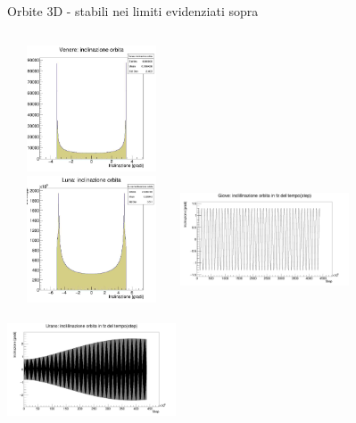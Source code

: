         \begin{frame}{Orbite 3D - stabili nei limiti evidenziati sopra}
            \begin{columns}
                    \centering        
                    \includegraphics[width=5cm,height=3.75cm]{7_incli/ven_incl_500_3600.jpg}\\
                    \includegraphics[width=5cm,height=3.75cm]{7_incli/lun_incl_600_60.jpg}
                    \label{cfr::vin}              
                    \centering        
                    \includegraphics[width=5cm,height=3.75cm]{7_incli/gio_inc_temp_500_3600.jpg}\\
                    \includegraphics[width=5cm,height=3.75cm]{7_incli/ura_inc_bug_50k_3600.jpg}
                    \label{cfr::sdf}
            \end{columns}
        \end{frame}
        
